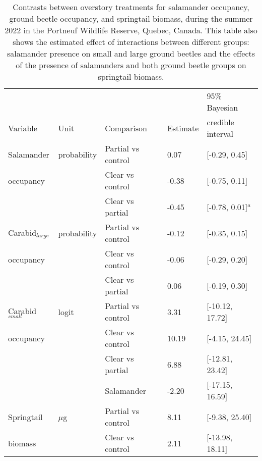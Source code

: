 \begin{table}[h!]
  \centering
  \caption[Contrasts between overstory treatments for salamander occupancy, ground beetle occupancy, and springtail biomass.]
  {Contrasts between overstory treatments for salamander occupancy, ground beetle occupancy, and springtail biomass, during the summer 2022 in the Portneuf Wildlife Reserve, Quebec, Canada. 
  This table also shows the estimated effect of interactions between different groups: salamander presence on small and large ground beetles and the effects of the presence of salamanders and both ground beetle groups on springtail biomass.}
  \label{tab:overstorysp}
  \begin{tabular}{lllll} 
      \hline
      &&&&95\% Bayesian \\
      Variable&Unit& Comparison & Estimate &  credible interval \\ [0.5ex] 
      \hline     
      Salamander           &probability& Partial vs control & \hspace{1mm}0.07 & [-0.29, 0.45] \\ 
      occupancy       && Clear vs control  & -0.38 & [-0.75, 0.11] \\ 
                          && Clear vs partial  & -0.45 & [-0.78, 0.01]$^{a}$ \\       
      Carabid$_{large}$ &probability& Partial vs control & -0.12 & [-0.35, 0.15] \\
      occupancy       && Clear vs control  & -0.06 & [-0.29, 0.20] \\ 
                          && Clear vs partial  & \hspace{1mm}0.06 & [-0.19, 0.30] \\ 
      Carabid$_{small}$    &logit& Partial vs control & \hspace{1mm}3.31 & [-10.12, 17.72] \\
      occupancy             && Clear vs control  & \hspace{1mm}10.19 & [-4.15, 24.45] \\ 
                          && Clear vs partial  & \hspace{1mm}6.88 & [-12.81, 23.42] \\  
                          && Salamander        & -2.20 & [-17.15, 16.59] \\  
      Springtail          &$\mu$g& Partial vs control & \hspace{1mm}8.11 & [-9.38, 25.40] \\
      biomass             && Clear vs control  & \hspace{1mm}2.11 & [-13.98, 18.11] \\ 

\end{tabular}
\end{table}
